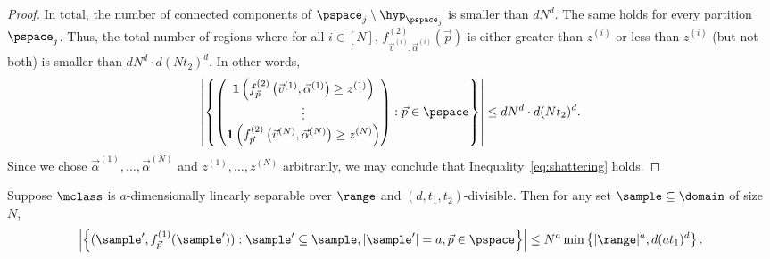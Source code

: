 \begin{proof}
In total, the number of 
connected components of $\pspace_j \setminus \hyp_{\pspace_j}$ is smaller than $dN^d$. 
The same holds for every partition $\pspace_j$. Thus, the total number of regions where 
for all $i \in [N]$, $f^{(2)}_{\vec{v}^{(i)}, \vec{\alpha}^{(i)}}\left(\vec{p}\right)$ is either greater 
than $z^{(i)}$ or less than $z^{(i)}$ (but not both) is smaller than $dN^d\cdot d(Nt_2)^d$. In other words, \[\left|\left\{\begin{pmatrix}
\textbf{1}\left(f^{(2)}_{\vec{p}}\left(\vec{v}^{(1)}, \vec{\alpha}^{(1)}\right) \geq z^{(1)}\right)\\
\vdots\\
\textbf{1}\left(f^{(2)}_{\vec{p}}\left(\vec{v}^{(N)}, \vec{\alpha}^{(N)}\right) \geq z^{(N)}\right)
\end{pmatrix} : \vec{p} \in \pspace\right\}\right| \leq dN^d\cdot d(Nt_2)^d.\] Since we chose $\vec{\alpha}^{(1)}, \dots, \vec{\alpha}^{(N)}$ and $z^{(1)}, \dots, z^{(N)}$ arbitrarily, we may conclude that Inequality~\eqref{eq:shattering} holds.
\end{proof}

\begin{lemma}\label{lem:f1labels}
Suppose $\mclass$ is $a$-dimensionally linearly separable over $\range$ and $(d,t_1, t_2)$-divisible. Then for any set $\sample \subseteq \domain$ of size $N$, \[\left|\left\{ (\sample', f^{(1)}_{\vec{p}}(\sample')) : \sample' \subseteq \sample, |\sample'| = a, \vec{p} \in \pspace\right\}\right| \leq N^a\min\left\{|\range|^a, d(at_1)^d\right\}.\]
\end{lemma}

